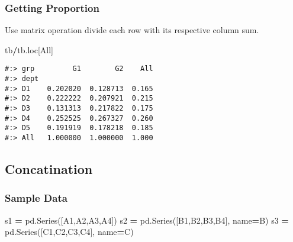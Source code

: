 \documentclass[
]{book}
\newenvironment{Shaded}{\begin{snugshade}}{\end{snugshade}}
\newcommand{\NormalTok}[1]{#1}
\newcommand{\OperatorTok}[1]{\textcolor[rgb]{0.43,0.43,0.43}{\textbf{#1}}}
\newcommand{\StringTok}[1]{\textcolor[rgb]{0.5,0.5,0.5}{#1}}
\begin{document}
\hypertarget{getting-proportion}{%
\subsubsection{Getting Proportion}\label{getting-proportion}}

Use matrix operation divide each row with its respective column sum.

\begin{Shaded}
\begin{Highlighting}[]
\NormalTok{tb}\OperatorTok{/}\NormalTok{tb.loc[}\StringTok{\textquotesingle{}All\textquotesingle{}}\NormalTok{]}
\end{Highlighting}
\end{Shaded}

\begin{verbatim}
#:> grp         G1        G2    All
#:> dept                           
#:> D1    0.202020  0.128713  0.165
#:> D2    0.222222  0.207921  0.215
#:> D3    0.131313  0.217822  0.175
#:> D4    0.252525  0.267327  0.260
#:> D5    0.191919  0.178218  0.185
#:> All   1.000000  1.000000  1.000
\end{verbatim}

\hypertarget{concatination}{%
\subsection{Concatination}\label{concatination}}

\hypertarget{sample-data-3}{%
\subsubsection{Sample Data}\label{sample-data-3}}

\begin{Shaded}
\begin{Highlighting}[]
\NormalTok{s1 }\OperatorTok{=}\NormalTok{ pd.Series([}\StringTok{\textquotesingle{}A1\textquotesingle{}}\NormalTok{,}\StringTok{\textquotesingle{}A2\textquotesingle{}}\NormalTok{,}\StringTok{\textquotesingle{}A3\textquotesingle{}}\NormalTok{,}\StringTok{\textquotesingle{}A4\textquotesingle{}}\NormalTok{])}
\NormalTok{s2 }\OperatorTok{=}\NormalTok{ pd.Series([}\StringTok{\textquotesingle{}B1\textquotesingle{}}\NormalTok{,}\StringTok{\textquotesingle{}B2\textquotesingle{}}\NormalTok{,}\StringTok{\textquotesingle{}B3\textquotesingle{}}\NormalTok{,}\StringTok{\textquotesingle{}B4\textquotesingle{}}\NormalTok{], name}\OperatorTok{=}\StringTok{\textquotesingle{}B\textquotesingle{}}\NormalTok{)}
\NormalTok{s3 }\OperatorTok{=}\NormalTok{ pd.Series([}\StringTok{\textquotesingle{}C1\textquotesingle{}}\NormalTok{,}\StringTok{\textquotesingle{}C2\textquotesingle{}}\NormalTok{,}\StringTok{\textquotesingle{}C3\textquotesingle{}}\NormalTok{,}\StringTok{\textquotesingle{}C4\textquotesingle{}}\NormalTok{], name}\OperatorTok{=}\StringTok{\textquotesingle{}C\textquotesingle{}}\NormalTok{)}
\end{Highlighting}
\end{Shaded}
\end{document}
